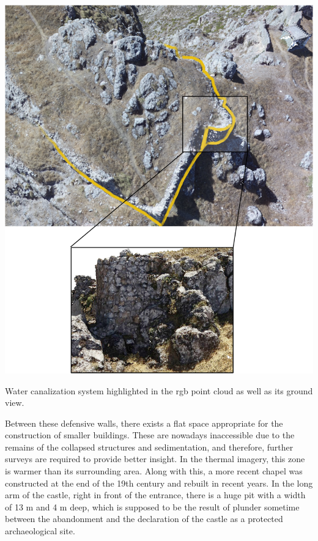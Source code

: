 \begin{marginfigure}[-2.0cm]
    \centering
    \includegraphics[width=\linewidth]{figs/castle_puerta_arenas/water_canalization.png}
	\caption{Water canalization system highlighted in the \acrshort{rgb} point cloud as well as its ground view.}
	\label{fig:water_sewer}
\end{marginfigure}

Between these defensive walls, there exists a flat space appropriate for the construction of smaller buildings. These are nowadays inaccessible due to the remains of the collapsed structures and sedimentation, and therefore, further surveys are required to provide better insight. In the thermal imagery, this zone is warmer than its surrounding area. Along with this, a more recent chapel was constructed at the end of the 19th century and rebuilt in recent years. In the long arm of the castle, right in front of the entrance, there is a huge pit with a width of 13 \si{\meter} and 4 \si{\meter} deep, which is supposed to be the result of plunder sometime between the abandonment and the declaration of the castle as a protected archaeological site. 

